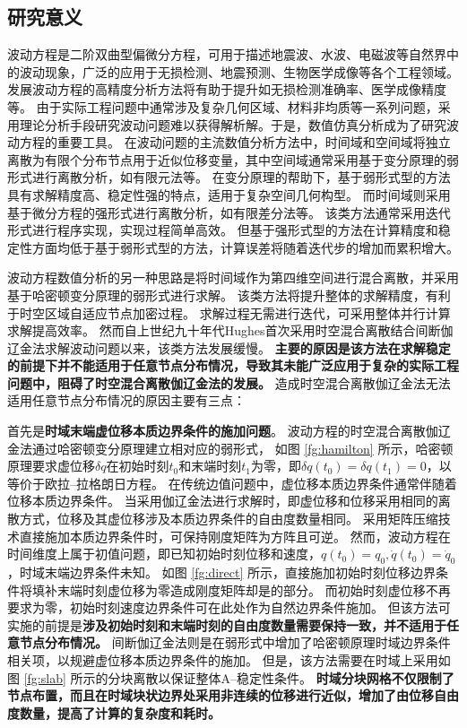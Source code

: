 
\subsection{研究意义}
波动方程是二阶双曲型偏微分方程\cite{bedford1994}，可用于描述地震波、水波、电磁波等自然界中的波动现象，广泛的应用于无损检测、地震预测、生物医学成像等各个工程领域。
发展波动方程的高精度分析方法将有助于提升如无损检测准确率、医学成像精度等。
由于实际工程问题中通常涉及复杂几何区域、材料非均质等一系列问题，采用理论分析手段研究波动问题难以获得解析解。于是，数值仿真分析成为了研究波动方程的重要工具。
在波动问题的主流数值分析方法中，时间域和空间域将独立离散为有限个分布节点用于近似位移变量，其中空间域通常采用基于变分原理的弱形式进行离散分析，如有限元法等。
在变分原理的帮助下，基于弱形式型的方法具有求解精度高、稳定性强的特点，适用于复杂空间几何构型。
而时间域则采用基于微分方程的强形式进行离散分析，如有限差分法等。
该类方法通常采用迭代形式进行程序实现，实现过程简单高效。
但基于强形式型的方法在计算精度和稳定性方面均低于基于弱形式型的方法，计算误差将随着迭代步的增加而累积增大。

波动方程数值分析的另一种思路是将时间域作为第四维空间进行混合离散，并采用基于哈密顿变分原理的弱形式进行求解。
该类方法将提升整体的求解精度，有利于时空区域自适应节点加密过程。
求解过程无需进行迭代，可采用整体并行计算求解提高效率。
然而自上世纪九十年代Hughes首次采用时空混合离散结合间断伽辽金法求解波动问题\cite{hughes1988}以来，该类方法发展缓慢。
\textbf{
主要的原因是该方法在求解稳定的前提下并不能适用于任意节点分布情况，导致其未能广泛应用于复杂的实际工程问题中，阻碍了时空混合离散伽辽金法的发展。
}
造成时空混合离散伽辽金法无法适用任意节点分布情况的原因主要有三点：

首先是\textbf{时域末端虚位移本质边界条件的施加问题}。
波动方程的时空混合离散伽辽金法通过哈密顿变分原理建立相对应的弱形式，
如图 \ref{fg:hamilton} 所示，哈密顿原理要求虚位移$\delta q$在初始时刻$t_0$和末端时刻$t_1$为零，即$\delta q(t_0)=\delta q(t_1)=0$，以等价于欧拉--拉格朗日方程\cite{arnold1978}。
在传统边值问题中，虚位移本质边界条件通常伴随着位移本质边界条件。
当采用伽辽金法进行求解时，即虚位移和位移采用相同的离散方式，位移及其虚位移涉及本质边界条件的自由度数量相同。
采用矩阵压缩技术直接施加本质边界条件时，可保持刚度矩阵为方阵且可逆。
然而，波动方程在时间维度上属于初值问题，即已知初始时刻位移和速度，$q(t_0)=q_0,\dot q(t_0) = \dot q_0$，时域末端边界条件未知。
如图 \ref{fg:direct} 所示，直接施加初始时刻位移边界条件将填补末端时刻虚位移为零造成刚度矩阵却是的部分。
而初始时刻虚位移不再要求为零，初始时刻速度边界条件可在此处作为自然边界条件施加。
但该方法可实施的前提是\textbf{涉及初始时刻和末端时刻的自由度数量需要保持一致，并不适用于任意节点分布情况。}
间断伽辽金法则是在弱形式中增加了哈密顿原理时域边界条件相关项，以规避虚位移本质边界条件的施加。
但是，该方法需要在时域上采用如图 \ref{fg:slab} 所示的分块离散以保证整体A--稳定性条件\cite{hughes1988}。
\textbf{时域分块网格不仅限制了节点布置，而且在时域块状边界处采用非连续的位移进行近似，增加了由位移自由度数量，提高了计算的复杂度和耗时。}


